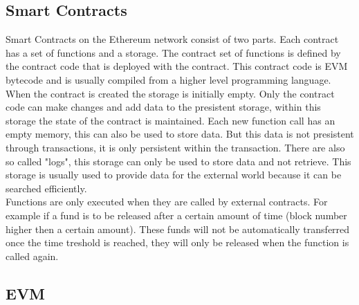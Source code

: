 \documentclass[a4paper]{article}
\begin{document}
\subsection{Smart Contracts}
Smart Contracts on the Ethereum network consist of two parts. Each contract has a set of functions and a storage. The contract set of functions is defined by the contract code that is deployed with the contract. This contract code is EVM bytecode and is usually compiled from a higher level programming language. When the contract is created the storage is initially empty. Only the contract code can make changes and add data to the presistent storage, within this storage the state of the contract is maintained. Each new function call has an empty memory, this can also be used to store data. But this data is not presistent through transactions, it is only persistent within the transaction. There are also so called "logs", this storage can only be used to store data and not retrieve. This storage is usually used to provide data for the external world because it can be searched efficiently.\\
Functions are only executed when they are called by external contracts. For example if a fund is to be released after a certain amount of time (block number higher then a certain amount). These funds will not be automatically transferred once the time treshold is reached, they will only be released when the function is called again.\\


\subsection{EVM}
\end{document}
